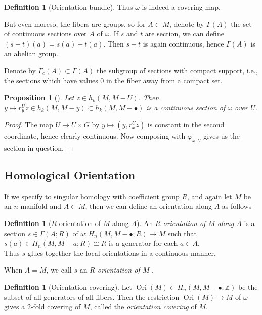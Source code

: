 \documentclass[reqno]{amsart}
\newtheorem{proposition}[theorem]{Proposition}
\theoremstyle{definition}
\newtheorem{definition}[theorem]{Definition}
\theoremstyle{remark}
\DeclareMathOperator{\Ori}{Ori}
\begin{document}
\begin{definition}[Orientation bundle]
    Thus $\omega$ is indeed a covering map.

    But even moreso, the fibers are groups, so
    for $A \subset M$, denote by
    $\Gamma(A)$ the set of continuous
    sections over $A$ of
    $\omega$. If
    $s$ and $t$ are section, we can define
    $(s+t)(a) = s(a) + t(a)$. Then
    $s+t$ is again continuous, hence $\Gamma(A)$ is an
    abelian group.

    Denote by $\Gamma_c(A) \subset 
    \Gamma(A)$ the subgroup of sections
    with compact support, i.e., the sections
    which have values $0$ in the fiber away from
    a compact set.
\end{definition}

\begin{proposition}[]\label{Prop:DJIXOZ}
    Let $z \in h_k(M, M- U)$. Then
    $y \mapsto r_y^{U} z
    \in h_k(M, M-y) \subset 
    h_k(M, M - \bullet)$ is a continuous section of $\omega$
    over $U$.
\end{proposition}


\begin{proof}
    The map
    $U \to U \times G$ by
    $y \mapsto (y, r_x^{U}z)$ is constant in the second coordinate,
    hence clearly continuous. Now composing with
    $\varphi_{x,U}$ gives us the section in question.
\end{proof}


\subsection{Homological Orientation}

If we specify to singular homology with coefficient
group $R$, and again let $M$ be an $n$-manifold and $A \subset M$,
then we can define an orientation along
$A$ as follows

\begin{definition}[$R$-orientation of $M$ along $A$]
    An \textit{$R$-orientation of $M$ along $A$} is a section
    $s \in \Gamma(A; R)$ of 
    $\omega \colon H_n \left( M , M - \bullet ; R \right) 
    \to M$ such that
    $s(a) \in 
    H_n(M, M-a; R) \cong R$ is a generator
    for each $a \in A$.\\


    Thus $s$ glues together the local orientations in a 
    continuous manner. 

    When $A = M$, we call $s$ an \textit{$R$-orientation of $M$ }.
\end{definition}

\begin{definition}[Orientation covering]
    Let $\Ori(M) \subset H_n(M, M - \bullet; \mathbb{Z})$ be the
    subset of all generators of all fibers. Then
    the restriction
    $\Ori (M) \to M$ of $\omega$ gives a $2$-fold
    covering of $M$, called the
    \textit{orientation covering} of $M$.
\end{definition}
\end{document}
